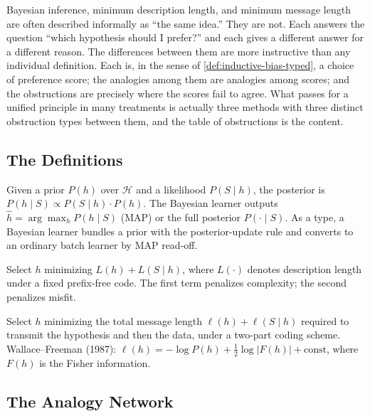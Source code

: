 Bayesian inference, minimum description length, and minimum message length are often described informally as ``the same idea.'' They are not. Each answers the question ``which hypothesis should I prefer?'' and each gives a different answer for a different reason. The differences between them are more instructive than any individual definition. Each is, in the sense of \cref{def:inductive-bias-typed}, a choice of preference score; the analogies among them are analogies among scores; and the obstructions are precisely where the scores fail to agree. What passes for a unified principle in many treatments is actually three methods with three distinct obstruction types between them, and the table of obstructions is the content.

\subsection{The Definitions}

\begin{defn}
\label{def:bayesian}
Given a prior $P(h)$ over $\mathcal{H}$ and a likelihood $P(S \mid h)$, the posterior is $P(h \mid S) \propto P(S \mid h) \cdot P(h)$. The Bayesian learner outputs $\hat{h} = \arg\max_{h} P(h \mid S)$ (MAP) or the full posterior $P(\cdot \mid S)$. As a type, a Bayesian learner bundles a prior with the posterior-update rule and converts to an ordinary batch learner by MAP read-off.
\end{defn}

\begin{defn}
\label{def:mdl}
Select $h$ minimizing $L(h) + L(S \mid h)$, where $L(\cdot)$ denotes description length under a fixed prefix-free code. The first term penalizes complexity; the second penalizes misfit.
\end{defn}

\begin{defn}
\label{def:mml}
Select $h$ minimizing the total message length $\ell(h) + \ell(S \mid h)$ required to transmit the hypothesis and then the data, under a two-part coding scheme. Wallace--Freeman (1987): $\ell(h) = -\log P(h) + \frac{1}{2}\log |F(h)| + \text{const}$, where $F(h)$ is the Fisher information.
\end{defn}

\subsection{The Analogy Network}

